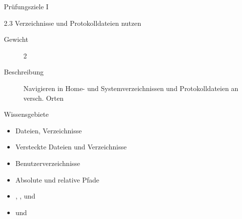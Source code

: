 \documentclass[aspectratio=43]{beamer}
\begin{document}
\begin{frame}{Prüfungsziele I}
  \begin{alertblock}{2.3 Verzeichnisse und Protokolldateien nutzen}
    \begin{description}
      \item[Gewicht]  2
      \item[Beschreibung] Navigieren in Home- und Systemverzeichnissen und Protokolldateien an versch. Orten
    \end{description}
       Wissensgebiete\\ 
        \begin{itemize}
          \item Dateien, Verzeichnisse
          \item Versteckte Dateien und Verzeichnisse
          \item Benutzerverzeichnisse
          \item Absolute und relative Pfade
          \item {}, ,  und \co{-}
          \item {} und 
        \end{itemize}
  \end{alertblock}
\end{frame}
\end{document}
